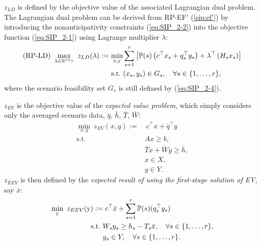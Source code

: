 $z_{LD}$ is defined by the objective value of the associated Lagrangian dual problem. The Lagrangian dual problem can be derived from RP-EF' (\ref{sip:ef'}) by introducing the nonanticipativity constraints (\ref{eq:SIP_2-2}) into the objective function (\ref{eq:SIP_2-1}) using Lagrange multiplier $\lambda$:
\begin{subequations}\label{ld}
	\begin{align}
	\textrm{(RP-LD) }\max_{\lambda\in\mathbb{R}^{rn_1}}\ z_{LD}(\lambda) :=\min_{\mathrm{x},\mathrm{y}}  &\sum_{s=1}^{r}\left[\operatorname*{\mathbb{P}}(s)\left(c^{\top}x_s+q_s^{\top}y_s\right)+\lambda^\top \left(H_s x_s\right)\right] \label{ld:obj}\\ 
	\mathrm{s.t.}\ & (x_s,y_s)\in G_s,\quad \forall s\in\{1,\ldots,r\},	 \label{ld:b}
	\end{align}
\end{subequations}
where the scenario feasibility set $G_s$ is still defined by (\ref{eq:SIP_2-4}).

$z_{EV}$ is the objective value of the \textit{expected value problem}, which simply considers only the averaged scenario data, $\bar{q}$, $\bar{h}$, $\bar{T}$, $\bar{W}$:
\begin{subequations}\label{ev}
	\begin{align}
	\min_{x,y}\ z_{EV}(x,y):=&\ c^{\top}x + \bar{q}^{\top}y \label{ev:obj}\\ 
	\mathrm{s.t.}\ &Ax\ge b,  \label{ev:b}\\
	&\bar{T} x+\bar{W} y\ge \bar{h},  \label{ev:c}\\
	&x\in X,  \label{ev:d}\\
	&y \in Y. \label{ev:e}
	\end{align}
\end{subequations}
$z_{EEV}$ is then defined by the \textit{expected result of using the first-stage solution of EV}, say $\bar{x}$: 
\begin{subequations}\label{eev}
	\begin{align}
	\min_{\mathrm{y}}\ z_{EEV}(\mathrm{y}):=&\ c^{\top}\bar{x} + \sum_{s=1}^{r}\operatorname*{\mathbb{P}}(s) (q_s^{\top}y_s) \label{eev:obj}\\ 
	\mathrm{s.t.}\ &W_s y_s\ge h_s-T_s \bar{x},\quad\forall s\in\{1,\ldots,r\}, \label{eev:b}\\
	&y_s \in Y,\quad\forall s\in\{1,\ldots,r\}. \label{eev:c}
	\end{align}
\end{subequations}

